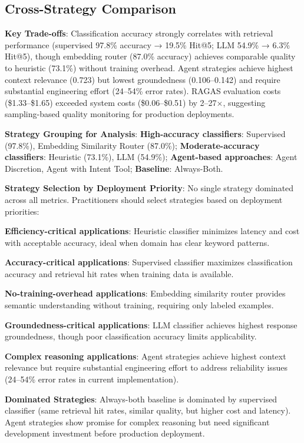 \documentclass[twocolumn,10pt]{article}
\begin{document}
\subsection{Cross-Strategy Comparison}

\textbf{Key Trade-offs}: Classification accuracy strongly correlates with retrieval performance (supervised 97.8\% accuracy → 19.5\% Hit@5; LLM 54.9\% → 6.3\% Hit@5), though embedding router (87.0\% accuracy) achieves comparable quality to heuristic (73.1\%) without training overhead. Agent strategies achieve highest context relevance (0.723) but lowest groundedness (0.106--0.142) and require substantial engineering effort (24--54\% error rates). RAGAS evaluation costs (\$1.33--\$1.65) exceeded system costs (\$0.06--\$0.51) by 2--27$\times$, suggesting sampling-based quality monitoring for production deployments.

\textbf{Strategy Grouping for Analysis}: \textbf{High-accuracy classifiers}: Supervised (97.8\%), Embedding Similarity Router (87.0\%); \textbf{Moderate-accuracy classifiers}: Heuristic (73.1\%), LLM (54.9\%); \textbf{Agent-based approaches}: Agent Discretion, Agent with Intent Tool; \textbf{Baseline}: Always-Both.

\textbf{Strategy Selection by Deployment Priority}: No single strategy dominated across all metrics. Practitioners should select strategies based on deployment priorities:

\textbf{Efficiency-critical applications}: Heuristic classifier minimizes latency and cost with acceptable accuracy, ideal when domain has clear keyword patterns.

\textbf{Accuracy-critical applications}: Supervised classifier maximizes classification accuracy and retrieval hit rates when training data is available.

\textbf{No-training-overhead applications}: Embedding similarity router provides semantic understanding without training, requiring only labeled examples.

\textbf{Groundedness-critical applications}: LLM classifier achieves highest response groundedness, though poor classification accuracy limits applicability.

\textbf{Complex reasoning applications}: Agent strategies achieve highest context relevance but require substantial engineering effort to address reliability issues (24--54\% error rates in current implementation).

\textbf{Dominated Strategies}: Always-both baseline is dominated by supervised classifier (same retrieval hit rates, similar quality, but higher cost and latency). Agent strategies show promise for complex reasoning but need significant development investment before production deployment.
\end{document}

